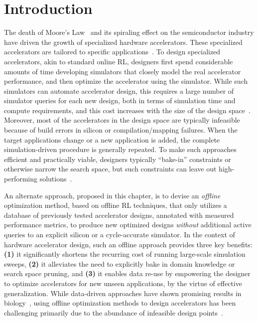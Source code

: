 \section{Introduction}
\label{sec:intro}
The death of Moore's Law~\citep{esmaeilzadeh2011dark} and its spiraling effect on the semiconductor industry have driven the growth of specialized hardware accelerators. These specialized accelerators are tailored to specific applications~\citep{yazdanbakhsh2021apollo,reagen2017case,prac_dse:mascots:2019,shi2020learned}. To design specialized accelerators, akin to standard online RL, designers first spend considerable amounts of time developing simulators that closely model the real accelerator performance, and then optimize the accelerator using the simulator. While such simulators can automate accelerator design, this requires a large number of simulator queries for each new design, both in terms of simulation time and compute requirements, and this cost increases with the size of the design space~\citep{yazdanbakhsh2021evaluation,shi2020learned,hegdemind}.
Moreover, most of the accelerators in the design space are typically infeasible~\citep{hegdemind,yazdanbakhsh2021apollo} because of build errors in silicon or compilation/mapping failures. 
When the target applications change or a new application is added, the complete simulation-driven procedure is generally repeated.
To make such approaches efficient and practically viable, designers typically ``bake-in'' constraints or otherwise narrow the search space, but such constraints can leave out high-performing solutions~\citep{dmazerunner,timeloop,marvel}.

An alternate approach, proposed in this chapter, is to devise an \textit{offline} optimization method, based on offline RL techniques, that only utilizes a database of previously tested accelerator designs, annotated with measured performance metrics, to produce new optimized designs \emph{without} additional active queries to an explicit silicon or a cycle-accurate simulator. In the context of hardware accelerator design, such an offline approach provides three key benefits: \textbf{(1)} it significantly shortens the recurring cost of running large-scale simulation sweeps, \textbf{(2)} it alleviates the need to explicitly bake in domain knowledge or search space pruning, and {\textbf{(3)} it enables data re-use by empowering the designer to optimize accelerators for new unseen applications, by the virtue of effective generalization.}
While data-driven approaches have shown promising results in biology~\citep{fu2021offline,brookes19a,trabucco2021conservative},
using offline optimization methods to design accelerators has been challenging primarily due to the abundance of infeasible design points~\citep{yazdanbakhsh2021apollo,hegdemind}.

